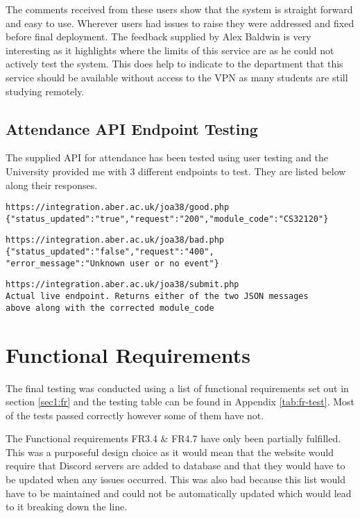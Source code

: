 The comments received from these users show that the system is straight forward and easy to use. Wherever users had issues to raise they were addressed and fixed before final deployment. The feedback supplied by Alex Baldwin is very interesting as it highlights where the limits of this service are as he could not actively test the system. This does help to indicate to the department that this service should be available without access to the VPN as many students are still studying remotely.

\subsection{Attendance API Endpoint Testing}
The supplied API for attendance has been tested using user testing and the University provided me with 3 different endpoints to test. They are listed below along their responses.

\begin{verbatim}
https://integration.aber.ac.uk/joa38/good.php
{"status_updated":"true","request":"200","module_code":"CS32120"}    
\end{verbatim}

\begin{verbatim}
https://integration.aber.ac.uk/joa38/bad.php
{"status_updated":"false","request":"400",
"error_message":"Unknown user or no event"}
\end{verbatim}

\begin{verbatim}
https://integration.aber.ac.uk/joa38/submit.php
Actual live endpoint. Returns either of the two JSON messages 
above along with the corrected module_code
\end{verbatim}

\section{Functional Requirements}\label{sec4:fr}
The final testing was conducted using a list of functional requirements set out in section \ref{sec1:fr} and the testing table can be found in Appendix \ref{tab:fr-test}. Most of the tests passed correctly however some of them have not.

The Functional requirements FR3.4 \& FR4.7 have only been partially fulfilled. This was a purposeful design choice as it would mean that the website would require that Discord servers are added to database and that they would have to be updated when any issues occurred. This was also bad because this list would have to be maintained and could not be automatically updated which would lead to it breaking down the line.